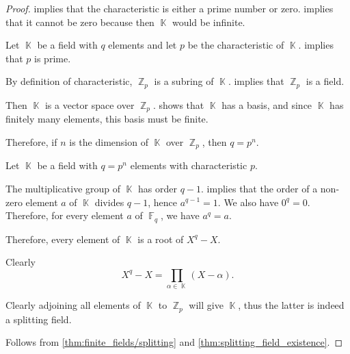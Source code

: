 \begin{proof}
    implies that the characteristic is either a prime number or zero.  implies that it cannot be zero because then \( \BbbK \) would be infinite.

   Let \( \BbbK \) be a field with \( q \) elements and let \( p \) be the characteristic of \( \BbbK \).  implies that \( p \) is prime.

  By definition of characteristic, \( \BbbZ_p \) is a subring of \( \BbbK \).  implies that \( \BbbZ_p \) is a field.

  Then \( \BbbK \) is a vector space over \( \BbbZ_p \).  shows that \( \BbbK \) has a basis, and since \( \BbbK \) has finitely many elements, this basis must be finite.

  Therefore, if \( n \) is the dimension of \( \BbbK \) over \( \BbbZ_p \), then \( q = p^n \).

   Let \( \BbbK \) be a field with \( q = p^n \) elements with characteristic \( p \).

  The multiplicative group of \( \BbbK \) has order \( q - 1 \).  implies that the order of a non-zero element \( a \) of \( \BbbK \) divides \( q - 1 \), hence \( a^{q - 1} = 1 \). We also have \( 0^q = 0 \). Therefore, for every element \( a \) of \( \BbbF_q \), we have \( a^q = a \).

  Therefore, every element of \( \BbbK \) is a root of \( X^q - X \).

   Clearly
  \begin{equation*}
    X^q - X = \prod_{\alpha \in \BbbK} (X - \alpha).
  \end{equation*}

  Clearly adjoining all elements of \( \BbbK \) to \( \BbbZ_p \) will give \( \BbbK \), thus the latter is indeed a splitting field.

   Follows from \cref{thm:finite_fields/splitting} and \cref{thm:splitting_field_existence}.
\end{proof}

